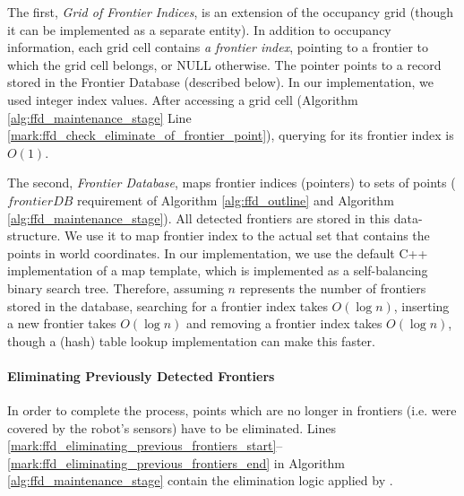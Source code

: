 The first, \emph{Grid of Frontier Indices}, is an extension
of the occupancy grid (though it can be implemented as a separate entity). In
addition to occupancy information, each grid cell contains \textit{a frontier
index}, pointing to a frontier to which the grid cell belongs, or NULL
otherwise. The pointer points to a record stored in the Frontier Database
(described below).
In our implementation, we used integer index values. After accessing a grid cell
(Algorithm \ref{alg:ffd_maintenance_stage} Line
\ref{mark:ffd_check_eliminate_of_frontier_point}), querying for its frontier
index is $O(1)$.
	
	
	
	The second, \emph{Frontier Database}, maps frontier
	indices (pointers) to sets of points ($frontierDB$ requirement of Algorithm
	\ref{alg:ffd_outline} and Algorithm \ref{alg:ffd_maintenance_stage}).
	All detected frontiers are stored in this data-structure. We use it to map frontier index to the actual set that
	contains the points in world coordinates. In our implementation, we use the
	default C++ implementation of a map template, which is implemented as a
	self-balancing binary search tree.
	Therefore, assuming $n$ represents the number of frontiers stored in the
	database, searching for a frontier index takes $O(\log n)$, inserting a new
	frontier takes $O(\log n)$ and removing a frontier index takes $O(\log n)$,
	though a (hash) table lookup implementation can make this faster.


	\paragraph{Eliminating Previously Detected Frontiers}
	\label{section:frontier_elimination}
	In order to complete the process, points which are no longer in frontiers  (i.e. were
	covered by the robot's sensors) have to be eliminated. Lines
	\ref{mark:ffd_eliminating_previous_frontiers_start}--\ref{mark:ffd_eliminating_previous_frontiers_end}
	in Algorithm \ref{alg:ffd_maintenance_stage} contain the elimination logic
	applied by \FFD.

